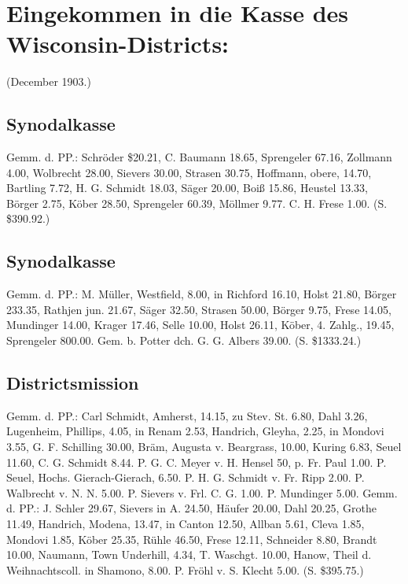 \chapter[Kasse des Wisconsin-Districts:]{Eingekommen in die Kasse des Wisconsin-Districts:}

(December 1903.)

\section{Synodalkasse}

Gemm. d. PP.: Schröder \$20.21, C. Baumann 18.65, Sprengeler 67.16, Zollmann 4.00, Wolbrecht 28.00, Sievers 30.00, Strasen 30.75, Hoffmann, obere, 14.70, Bartling 7.72, H. G. Schmidt 18.03, Säger 20.00, Boiß 15.86, Heustel 13.33, Börger 2.75, Köber 28.50, Sprengeler 60.39, Möllmer 9.77. C. H. Frese 1.00. (S. \$390.92.)

\section{Synodalkasse}

Gemm. d. PP.: M. Müller, Westfield, 8.00, in Richford 16.10, Holst 21.80, Börger 233.35, Rathjen jun. 21.67, Säger 32.50, Strasen 50.00, Börger 9.75, Frese 14.05, Mundinger 14.00, Krager 17.46, Selle 10.00, Holst 26.11, Köber, 4. Zahlg., 19.45, Sprengeler 800.00. Gem. b. Potter dch. G. G. Albers 39.00. (S. \$1333.24.)

\section{Districtsmission}

Gemm. d. PP.: Carl Schmidt, Amherst, 14.15, zu Stev. St. 6.80, Dahl 3.26, Lugenheim, Phillips, 4.05, in Renam 2.53, Handrich, Gleyha, 2.25, in Mondovi 3.55, G. F. Schilling 30.00, Bräm, Augusta v. Beargrass, 10.00, Kuring 6.83, Seuel 11.60, C. G. Schmidt 8.44. P. G. C. Meyer v. H. Hensel 50, p. Fr. Paul 1.00. P. Seuel, Hochs. Gierach-Gierach, 6.50. P. H. G. Schmidt v. Fr. Ripp 2.00. P. Walbrecht v. N. N. 5.00. P. Sievers v. Frl. C. G. 1.00. P. Mundinger 5.00. Gemm. d. PP.: J. Schler 29.67, Sievers in A. 24.50, Häufer 20.00, Dahl 20.25, Grothe 11.49, Handrich, Modena, 13.47, in Canton 12.50, Allban 5.61, Cleva 1.85, Mondovi 1.85, Köber 25.35, Rühle 46.50, Frese 12.11, Schneider 8.80, Brandt 10.00, Naumann, Town Underhill, 4.34, T. Waschgt. 10.00, Hanow, Theil d. Weihnachtscoll. in Shamono, 8.00. P. Fröhl v. S. Klecht 5.00. (S. \$395.75.)

